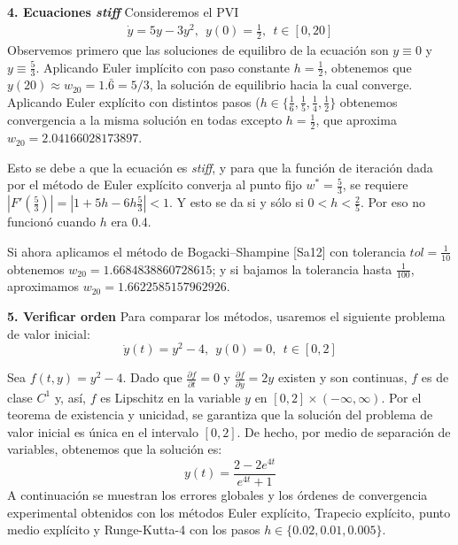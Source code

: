 \documentclass[11pt]{article}
\begin{document}
$ $\\

\noindent
\textbf{4. Ecuaciones \textit{stiff}}
\newline
Consideremos el PVI
\begin{align*}
\dot{y} = 5y-3y^2, \ \ y(0) = \frac{1}{2}, \ \ t \in [0,20]
\end{align*}
Observemos primero que las soluciones de equilibro de la ecuación son $y \equiv 0$ y 
$y \equiv \frac{5}{3}$.
Aplicando Euler implícito con paso constante $h = \frac{1}{2}$, obtenemos que
$y(20) \approx w_{20} = 1.\bar{6} = 5/3$, la solución de equilibrio hacia
la cual converge.
Aplicando Euler explícito con distintos pasos ($h \in \{\frac{1}{6}, \frac{1}{5}, 
\frac{1}{4}, \frac{1}{2} \}$ obtenemos convergencia a la misma solución en todas
excepto $h = \frac{1}{2}$, que aproxima $w_{20} = 2.04166028173897$.

Esto se debe a que la ecuación es \textit{stiff}, y para que la función de iteración
dada por el método de Euler explícito converja al punto fijo $w^* = \frac{5}{3}$, se
requiere $|F'(\frac{5}{3})| = |1+5h-6h\frac{5}{3}|<1$. Y esto se da si y sólo si 
$0 < h < \frac{2}{5}$. Por eso no funcionó cuando $h$ era 0.4.

Si ahora aplicamos el método de Bogacki–Shampine [Sa12]  con tolerancia $tol = 
\frac{1}{10}$  obtenemos $w_{20} = 1.6684838860728615$; y si bajamos la tolerancia 
hasta  $\frac{1}{100}$, aproximamos $w_{20} = 1.6622585157962926$. 

$ $\\ 

\noindent
\textbf{5. Verificar orden}
\newline
Para comparar los métodos, usaremos el siguiente problema de valor inicial:
$$
\dot{y}(t) = y^2-4, \ \ y(0) = 0,  \ \ t \in [0,2]
$$

Sea $f(t,y) = y^2-4$. Dado que $\frac{\partial f}{\partial t} = 0$ y $\frac{\partial f}{\partial y} = 2y$ existen y son continuas, $f$ es de clase $C^1$ y, así, $f$ es Lipschitz en la variable $y$ en $[0,2] \times (- \infty, \infty)$. Por el teorema de existencia y unicidad, se garantiza que la solución del problema de valor inicial es única en el intervalo $[0,2]$. De hecho, por medio de separación de variables, obtenemos que la solución es:
$$
y(t) = \frac{2-2e^{4t}}{e^{4t}+1}
$$ 
A continuación se muestran los errores globales y los órdenes de convergencia experimental obtenidos con los métodos Euler explícito, Trapecio explícito, punto medio explícito y Runge-Kutta-4 con los pasos $h \in \{ 0.02, 0.01, 0.005 \}$.
\end{document}
